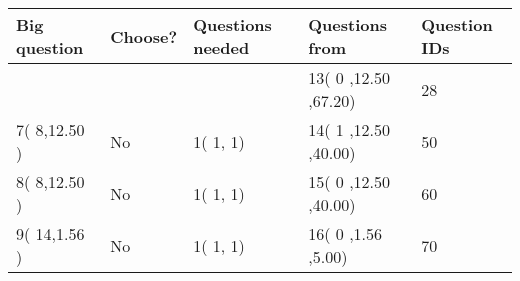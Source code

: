 \documentclass[12pt]{article}
\begin{document}
   
\noindent\hspace{-0.4in}\begin{tabular}{|l|l|l|l|l|}
\hline
 Big question & Choose? & Questions needed & Questions from & Question IDs \\ 
\hline
  & & &          13(          0
 ,12.50
 ,67.20) &          28 \\
 \hline
           7(          8,12.50
 ) &  No   & 
           1(          1,           1) &          14(          1
,12.50
 ,40.00) &          50 \\
 \hline
           8(          8,12.50
 ) &  No   & 
           1(          1,           1) &          15(          0
,12.50
 ,40.00) &          60 \\
 \hline
           9(         14,1.56
 ) &  No   & 
           1(          1,           1) &          16(          0
,1.56
 ,5.00) &          70 \\
 \hline
 \end{tabular}
 
 
\end{document}
